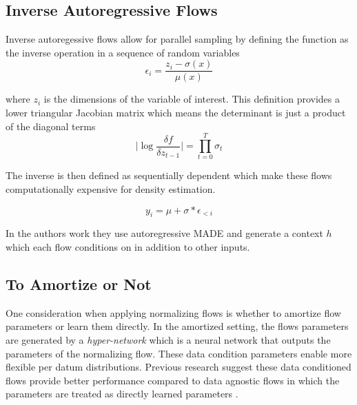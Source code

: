 

\subsection{Inverse Autoregressive Flows}

Inverse autoregessive flows allow for parallel sampling by defining the function as the inverse operation in a sequence of random variables \citet{kingma2016IAF}
\begin{equation}
\epsilon_{i} = \frac{z_{i} - \sigma(x)}{\mu(x)}
\end{equation}

where $z_{i}$ is the dimensions of the variable of interest. This definition provides a lower triangular Jacobian matrix which means the determinant is just a product of the diagonal terms
\begin{equation}
\bigg| \log \frac{\delta f}{\delta z_{t -1 } } \bigg| = \prod_{t=0}^{T} \sigma_{t}
\end{equation}

The inverse is then defined as sequentially dependent which make these flows computationally expensive for density estimation. 

\begin{equation}
y_{i} = \mu + \sigma * \epsilon_{<i}
\end{equation}

In the authors work they use autoregressive MADE \cite{gregor2015MADE} and generate a context $h$ which each flow conditions on in addition to other inputs. 


\subsection{To Amortize or Not}

One consideration when applying normalizing flows is whether to amortize flow parameters or learn them directly. In the amortized setting, the flows parameters are generated by a \textit{hyper-network} \cite{ha2016hypernets} which is a neural network that outputs the parameters of the normalizing flow. These data condition parameters enable more flexible per datum distributions. Previous research suggest these data conditioned flows provide better performance compared to data agnostic flows in which the parameters are treated as directly learned parameters \cite{vdberg2018sylvester}.

